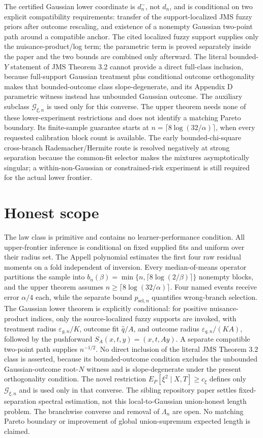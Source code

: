 \documentclass{article}
\begin{document}
The certified Gaussian lower coordinate is \(d_n^-\), not \(d_n\), and is conditional on two explicit compatibility requirements: transfer of the support-localized JMS fuzzy priors after outcome rescaling, and existence of a nonempty Gaussian two-point path around a compatible anchor. The cited localized fuzzy support supplies only the nuisance-product/log term; the parametric term is proved separately inside the paper and the two bounds are combined only afterward. The literal bounded-\(Y\) statement of JMS Theorem 3.2 cannot provide a direct full-class inclusion, because full-support Gaussian treatment plus conditional outcome orthogonality makes that bounded-outcome class slope-degenerate, and its Appendix D parametric witness instead has unbounded Gaussian outcome. The auxiliary subclass \(\mathcal G_{\xi,n}\) is used only for this converse. The upper theorem needs none of these lower-experiment restrictions and does not identify a matching Pareto boundary. Its finite-sample guarantee starts at \(n=\lceil8\log(32/\alpha)\rceil\), when every requested calibration block count is available. The early bounded-chi-square cross-branch Rademacher/Hermite route is resolved negatively at strong separation because the common-fit selector makes the mixtures asymptotically singular; a within-non-Gaussian or constrained-risk experiment is still required for the actual lower frontier.

\section{Honest scope}

The law class is primitive and contains no learner-performance condition. All upper-frontier inference is conditional on fixed supplied fits and uniform over their radius set. The Appell polynomial estimates the first four raw residual moments on a fold independent of inversion. Every median-of-means operator partitions the sample into \(b_n(\beta)=\min\{n,\lceil8\log(2/\beta)\rceil\}\) nonempty blocks, and the upper theorem assumes \(n\ge\lceil8\log(32/\alpha)\rceil\). Four named events receive error \(\alpha/4\) each, while the separate bound \(p_{\mathrm{sel},n}\) quantifies wrong-branch selection. The Gaussian lower theorem is explicitly conditional: for positive nuisance-product indices, only the source-localized fuzzy supports are invoked, with treatment radius \(\varepsilon_{g,n}/K\), outcome fit \(\widehat q/A\), and outcome radius \(\varepsilon_{q,n}/(KA)\), followed by the pushforward \(S_A(x,t,y)=(x,t,Ay)\). A separate compatible two-point path supplies \(n^{-1/2}\). No direct inclusion of the literal JMS Theorem 3.2 class is asserted, because its bounded-outcome condition excludes the unbounded Gaussian-outcome root-\(N\) witness and is slope-degenerate under the present orthogonality condition. The novel restriction \(E_P[\xi^2\mid X,T]\ge c_{\xi}\) defines only \(\mathcal G_{\xi,n}\) and is used only in that converse. The sibling repository paper settles fixed-separation spectral estimation, not this local-to-Gaussian union-honest length problem. The branchwise converse and removal of \(\Lambda_n\) are open. No matching Pareto boundary or improvement of global union-supremum expected length is claimed.
\end{document}
